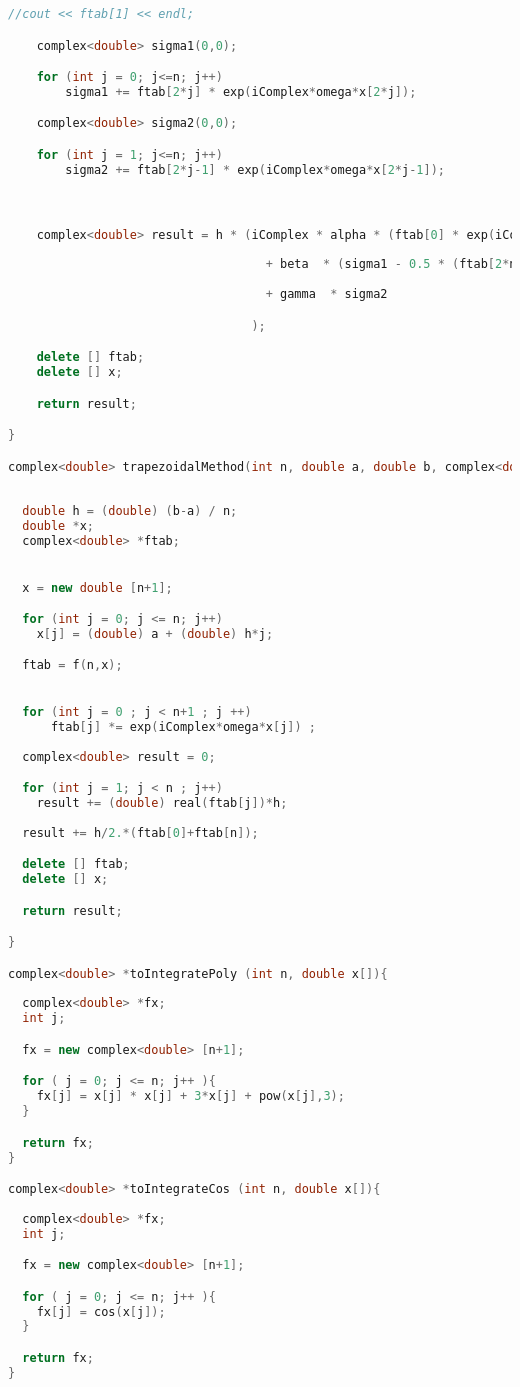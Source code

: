 \begin{lstlisting}[language=C++]
    //cout << ftab[1] << endl;

    complex<double> sigma1(0,0);

    for (int j = 0; j<=n; j++)
        sigma1 += ftab[2*j] * exp(iComplex*omega*x[2*j]);

    complex<double> sigma2(0,0);

    for (int j = 1; j<=n; j++)
        sigma2 += ftab[2*j-1] * exp(iComplex*omega*x[2*j-1]);



    complex<double> result = h * (iComplex * alpha * (ftab[0] * exp(iComplex*omega*x[0]) - ftab[2*n] * exp(iComplex*omega*x[2*n])) 
                                   
                                    + beta  * (sigma1 - 0.5 * (ftab[2*n] * exp(iComplex*omega*x[2*n]) + ftab[0] * exp(iComplex*omega*x[0])))
                                   
                                    + gamma  * sigma2

                                  );

    delete [] ftab;
    delete [] x;

    return result;

}

complex<double> trapezoidalMethod(int n, double a, double b, complex<double> *f(int n , double x[]), double omega){
  
      
  double h = (double) (b-a) / n;
  double *x;
  complex<double> *ftab;

 
  x = new double [n+1];

  for (int j = 0; j <= n; j++)
    x[j] = (double) a + (double) h*j; 

  ftab = f(n,x); 

               
  for (int j = 0 ; j < n+1 ; j ++)                              
      ftab[j] *= exp(iComplex*omega*x[j]) ;
    
  complex<double> result = 0;

  for (int j = 1; j < n ; j++)
    result += (double) real(ftab[j])*h;
  
  result += h/2.*(ftab[0]+ftab[n]);

  delete [] ftab;
  delete [] x;

  return result;

}

complex<double> *toIntegratePoly (int n, double x[]){
  
  complex<double> *fx;
  int j;

  fx = new complex<double> [n+1];

  for ( j = 0; j <= n; j++ ){
    fx[j] = x[j] * x[j] + 3*x[j] + pow(x[j],3);
  }

  return fx;
}

complex<double> *toIntegrateCos (int n, double x[]){
  
  complex<double> *fx;
  int j;

  fx = new complex<double> [n+1];

  for ( j = 0; j <= n; j++ ){
    fx[j] = cos(x[j]);
  }

  return fx;
}


\end{lstlisting}

